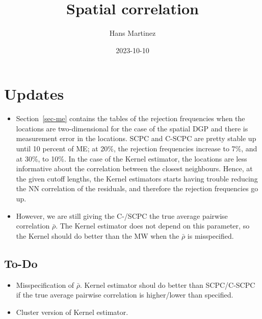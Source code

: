 \documentclass[
]{article}
\title{Spatial correlation}
\author{Hans Martinez}
\date{2023-10-10}
\providecommand{\tightlist}{%
  \setlength{\itemsep}{0pt}\setlength{\parskip}{0pt}}\usepackage{longtable,booktabs,array}
\begin{document}
\maketitle
\ifdefined\Shaded\renewenvironment{Shaded}{\begin{tcolorbox}[enhanced, boxrule=0pt, interior hidden, sharp corners, borderline west={3pt}{0pt}{shadecolor}, frame hidden, breakable]}{\end{tcolorbox}}\fi

\hypertarget{updates}{%
\section*{Updates}\label{updates}}

\begin{itemize}
\tightlist
\item
  Section~\ref{sec-me} contains the tables of the rejection frequencies
  when the locations are two-dimensional for the case of the spatial DGP
  and there is measurement error in the locations. SCPC and C-SCPC are
  pretty stable up until 10 percent of ME; at 20\%, the rejection
  frequencies increase to 7\%, and at 30\%, to 10\%. In the case of the
  Kernel estimator, the locations are less informative about the
  correlation between the closest neighbours. Hence, at the given cutoff
  lengths, the Kernel estimators starts having trouble reducing the NN
  correlation of the residuals, and therefore the rejection frequencies
  go up.
\item
  However, we are still giving the C-/SCPC the true average pairwise
  correlation \(\bar\rho\). The Kernel estimator does not depend on this
  parameter, so the Kernel should do better than the MW when the
  \(\bar\rho\) is misspecified.
\end{itemize}

\hypertarget{to-do}{%
\subsection*{To-Do}\label{to-do}}

\begin{itemize}
\tightlist
\item
  Misspecification of \(\bar\rho\). Kernel estimator shoul do better
  than SCPC/C-SCPC if the true average pairwise correlation is
  higher/lower than specified.
\item
  Cluster version of Kernel estimator.
\end{itemize}
\end{document}
